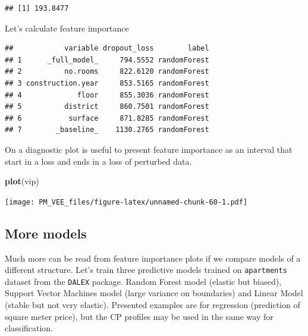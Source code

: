 \documentclass[12pt,]{krantz}
\newenvironment{Shaded}{\begin{snugshade}}{\end{snugshade}}
\newcommand{\DataTypeTok}[1]{\textcolor[rgb]{0.13,0.29,0.53}{#1}}
\newcommand{\DecValTok}[1]{\textcolor[rgb]{0.00,0.00,0.81}{#1}}
\newcommand{\KeywordTok}[1]{\textcolor[rgb]{0.13,0.29,0.53}{\textbf{#1}}}
\newcommand{\NormalTok}[1]{#1}
\newcommand{\OperatorTok}[1]{\textcolor[rgb]{0.81,0.36,0.00}{\textbf{#1}}}
\newcommand{\StringTok}[1]{\textcolor[rgb]{0.31,0.60,0.02}{#1}}
\theoremstyle{definition}
\theoremstyle{definition}
\theoremstyle{definition}
\theoremstyle{remark}
\begin{document}
\begin{verbatim}
## [1] 193.8477
\end{verbatim}

Let's calculate feature importance

\begin{Shaded}
\end{Shaded}

\begin{verbatim}
##            variable dropout_loss        label
## 1      _full_model_     794.5552 randomForest
## 2          no.rooms     822.6120 randomForest
## 3 construction.year     853.5165 randomForest
## 4             floor     855.3036 randomForest
## 5          district     860.7501 randomForest
## 6           surface     871.8285 randomForest
## 7        _baseline_    1130.2765 randomForest
\end{verbatim}

On a diagnostic plot is useful to present feature importance as an
interval that start in a loss and ends in a loss of perturbed data.

\begin{Shaded}
\begin{Highlighting}[]
\KeywordTok{plot}\NormalTok{(vip)}
\end{Highlighting}
\end{Shaded}

\texttt{[image: PM\_VEE\_files/figure-latex/unnamed-chunk-60-1.pdf]}

\hypertarget{more-models}{%
\subsection{More models}\label{more-models}}

Much more can be read from feature importance plots if we compare models
of a different structure. Let's train three predictive models trained on
\texttt{apartments} dataset from the \texttt{DALEX} package. Random
Forest model \citep{R-randomForest} (elastic but biased), Support Vector
Machines model \citep{R-e1071} (large variance on boundaries) and Linear
Model (stable but not very elastic). Presented examples are for
regression (prediction of square meter price), but the CP profiles may
be used in the same way for classification.
\end{document}
